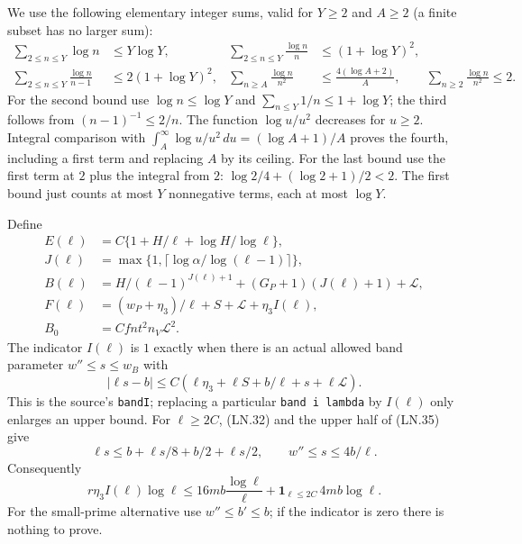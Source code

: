 We use the following elementary integer sums, valid for $Y\ge2$
and $A\ge2$ (a finite subset has no larger sum):
\[
 \begin{aligned}
 \sum_{2\le n\le Y}\log n&\le Y\log Y,&
 \sum_{2\le n\le Y}\frac{\log n}{n}&\le(1+\log Y)^2,\\
 \sum_{2\le n\le Y}\frac{\log n}{n-1}&\le2(1+\log Y)^2,&
 \sum_{n\ge A}\frac{\log n}{n^2}&\le\frac{4(\log A+2)}A,\qquad
 \sum_{n\ge2}\frac{\log n}{n^2}\le2.
 \end{aligned}                                                  \tag{LN.33}
\]
For the second bound use $\log n\le\log Y$ and
$\sum_{n\le Y}1/n\le1+\log Y$; the third follows from
$(n-1)^{-1}\le2/n$.  The function $\log u/u^2$ decreases for
$u\ge2$.  Integral comparison with
$\int_A^\infty\log u/u^2\,du=(\log A+1)/A$ proves the fourth,
including a first term and replacing $A$ by its ceiling.  For the
last bound use the first term at $2$ plus the integral from $2$:
$\log2/4+(\log2+1)/2<2$.  The first bound just counts at most
$Y$ nonnegative terms, each at most $\log Y$.

Define
\[
 \begin{split}
 E(\ell)&=C\{1+H/\ell+\log H/\log\ell\},\\
 J(\ell)&=\max\{1,\lceil\log\alpha/\log(\ell-1)\rceil\},\\
 B(\ell)&=H/(\ell-1)^{J(\ell)+1}
                         +(G_P+1)(J(\ell)+1)+\mathcal L,\\
 F(\ell)&=(w_P+\eta_3)/\ell+S+\mathcal L+
                                                \eta_3 I(\ell),\\
 B_0&=Cfnt^2n_V\mathcal L^2.
 \end{split}                                                   \tag{LN.34}
\]
The indicator $I(\ell)$ is $1$ exactly when there is an actual
allowed band parameter $w''\le s\le w_B$ with
\[
 |\ell s-b|\le C(\ell\eta_3+\ell S+b/\ell+s+\ell\mathcal L).
 \tag{LN.35}
\]
This is the source's \texttt{bandI}; replacing a particular
\texttt{band i lambda} by $I(\ell)$ only enlarges an upper bound.
For $\ell\ge2C$, (LN.32) and the upper half of (LN.35) give
\[
 \ell s\le b+\ell s/8+b/2+\ell s/2,
 \qquad w''\le s\le4b/\ell.
 \tag{LN.36}
\]
Consequently
\[
 r\eta_3 I(\ell)\log\ell
 \le16mb\frac{\log\ell}{\ell}
          +\mathbf1_{\ell\le2C}\,4mb\log\ell.       \tag{LN.37}
\]
For the small-prime alternative use $w''\le b'\le b$; if the
indicator is zero there is nothing to prove.

